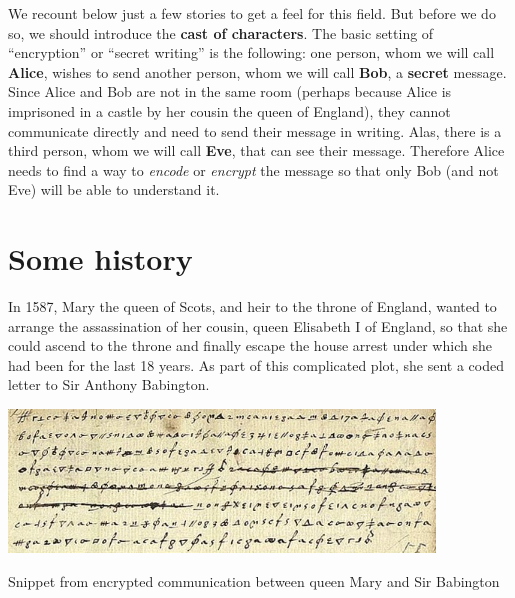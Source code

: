 We recount below just a few stories to get a feel for this field. But
before we do so, we should introduce the \textbf{cast of characters}.
The basic setting of ``encryption'' or ``secret writing'' is the
following: one person, whom we will call \textbf{Alice}, wishes to send
another person, whom we will call \textbf{Bob}, a \textbf{secret}
message. Since Alice and Bob are not in the same room (perhaps because
Alice is imprisoned in a castle by her cousin the queen of England),
they cannot communicate directly and need to send their message in
writing. Alas, there is a third person, whom we will call \textbf{Eve},
that can see their message. Therefore Alice needs to find a way to
\emph{encode} or \emph{encrypt} the message so that only Bob (and not
Eve) will be able to understand it.

\section{Some history}\label{1-Some-history}

In 1587, Mary the queen of Scots, and heir to the throne of England,
wanted to arrange the assassination of her cousin, queen Elisabeth I of
England, so that she could ascend to the throne and finally escape the
house arrest under which she had been for the last 18 years. As part of
this complicated plot, she sent a coded letter to Sir Anthony Babington.

\begin{marginfigure}
\centering
\includegraphics[width=\linewidth, height=1.5in, keepaspectratio]{../figure/encrypted_letter.jpg}
\caption{Snippet from encrypted communication between queen Mary and Sir
Babington}
\label{maryscottletterfig}
\end{marginfigure}

